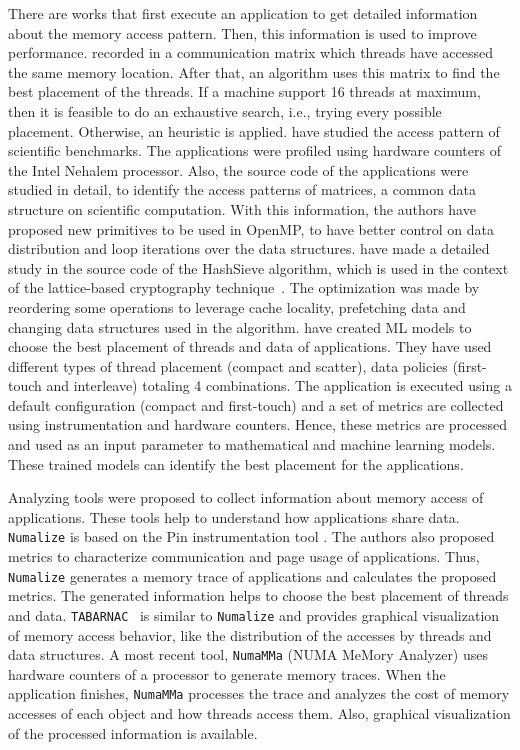 There are works that first execute an application to get detailed information about the memory access pattern. Then, this information is used to improve performance.  recorded in a communication matrix which threads have accessed the same memory location. After that, an algorithm uses this matrix to find the best placement of the threads. If a machine support 16 threads at maximum, then it is feasible to do an exhaustive search, i.e., trying every possible placement. Otherwise, an heuristic is applied.  have studied the access pattern of scientific benchmarks. The applications were profiled using hardware counters of the Intel Nehalem processor. Also, the source code of the applications were studied in detail, to identify the access patterns of matrices, a common data structure on scientific computation. With this information, the authors have proposed new primitives to be used in OpenMP, to have better control on data distribution and  loop iterations over the data structures.  have made a detailed study in the source code of the HashSieve algorithm, which is used in the context of the lattice-based cryptography technique~\cite{Micciancio:2009}. The optimization was made by reordering some operations to leverage cache locality, prefetching data and changing data structures used in the algorithm.  have created ML models to choose the best placement of threads and data of applications. They have used different types of thread placement (compact and scatter), data policies (first-touch and interleave) totaling 4 combinations. The application is executed using a default configuration (compact and first-touch) and a set of metrics are collected using instrumentation and hardware counters. Hence, these metrics are processed and used as an input parameter to mathematical and machine learning models. These trained models can identify the best placement for the applications.

Analyzing tools were proposed to collect information about  memory access of  applications. These tools help to understand how applications share data. \texttt{Numalize} \cite{Diener2015} is based on the Pin instrumentation tool \cite{Luk:2005}. The authors also proposed metrics to characterize communication and page usage of applications. Thus, \texttt{Numalize} generates a memory trace of applications and calculates the proposed metrics. The generated information helps to choose the best placement of threads and data. \texttt{TABARNAC}~\cite{Beniamine:2015} is similar to \texttt{Numalize} and provides graphical visualization of memory access behavior, like the distribution of the accesses by threads and data structures. A most recent tool, \texttt{NumaMMa} (NUMA MeMory Analyzer) \cite{Trahay:2018} uses hardware counters of a processor to generate memory traces. When the application finishes, \texttt{NumaMMa} processes the trace and analyzes the cost of memory accesses of each object and how threads access them. Also, graphical visualization of the processed information is available.

